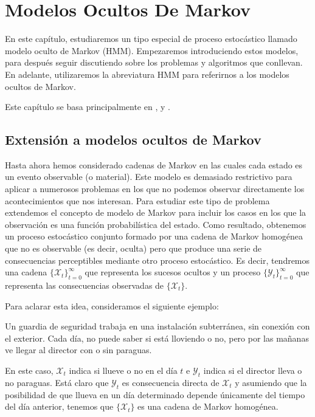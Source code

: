 \chapter{Modelos Ocultos De Markov}

En este capítulo, estudiaremos un tipo especial de proceso estocástico llamado modelo oculto de Markov (HMM). Empezaremos introduciendo estos modelos, para después seguir discutiendo sobre los problemas y algoritmos que conllevan. En adelante, utilizaremos la abreviatura HMM para referirnos a los modelos ocultos de Markov. 

Este capítulo se basa principalmente en \cite{Rabiner}, \cite[Capítulo 2]{Stamp} y \cite{Sevilla_2019}.
\section{Extensión a modelos ocultos de Markov}
Hasta ahora hemos considerado cadenas de Markov en las cuales cada estado es un evento observable (o material). Este modelo es demasiado restrictivo para aplicar a numerosos problemas en los que no podemos observar directamente los acontecimientos que nos interesan. Para estudiar este tipo de problema extendemos el concepto de modelo de Markov para incluir los casos en los que la observación es una función probabilística del estado. Como resultado, obtenemos un proceso estocástico conjunto formado por una cadena de Markov homogénea que no es observable (es decir, oculta) pero que produce una serie de consecuencias perceptibles mediante otro proceso estocástico. Es decir, tendremos una cadena $\{\mathcal{X}_t\}_{t=0}^{\infty}$ que representa los sucesos ocultos y un proceso $\{\mathcal{Y}_t\}_{t=0}^{\infty}$ que representa las consecuencias observadas de $\{\mathcal{X}_t\}$. 

Para aclarar esta idea, consideramos el siguiente ejemplo:
\begin{exampleth}\label{ejemplo_paraguas}
Un guardia de seguridad trabaja en una instalación subterránea, sin conexión con el exterior. Cada día, no puede saber si está lloviendo o no, pero por las mañanas ve llegar al director con o sin paraguas.

En este caso, $\mathcal{X}_t$ indica si llueve o no en el día $t$ e $\mathcal{Y}_t$ indica si el director lleva o no paraguas. Está claro que $\mathcal{Y}_t$ es consecuencia directa de $\mathcal{X}_t$ y asumiendo que la posibilidad de que llueva en un día determinado depende únicamente del tiempo del día anterior, tenemos que $\{\mathcal{X}_t\}$ es una cadena de Markov homogénea.
\end{exampleth}

